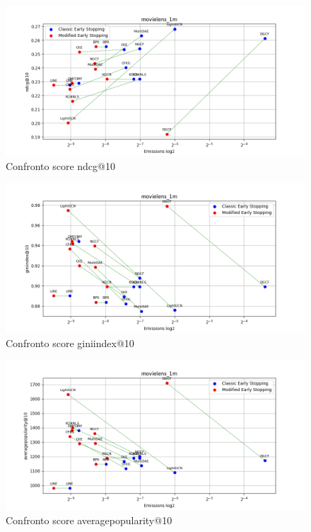 \begin{figure}[H]
    \centering
    \includegraphics[width=\linewidth, trim=0 0 0 0]{images/ndcg@10_movielens_1m_40_7_comparison.png}
    \caption{Confronto score ndcg@10}
    
\end{figure}

\begin{figure}[H]
    \centering
    \includegraphics[width=\linewidth, trim=0 0 0 0]{images/giniindex@10_movielens_1m_40_7_comparison.png}
    \caption{Confronto score giniindex@10}
\end{figure}

\begin{figure}[H]
    \centering
    \includegraphics[width=\linewidth, trim=0 0 0 0]{images/averagepopularity@10_movielens_1m_40_7_comparison.png}
    \caption{Confronto score averagepopularity@10}
\end{figure}


